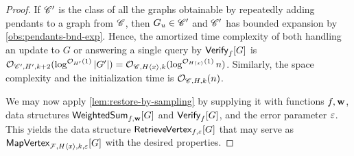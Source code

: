 \begin{proof}
	If $\mathscr C'$ is the class of all the graphs obtainable by repeatedly adding pendants to a graph from $\mathscr C$, then $G_u \in \mathscr C'$ and $\mathscr C'$ has bounded expansion by \cref{obs:pendants-bnd-exp}. Hence, the amortized time complexity of both handling an update to $G$ or answering a single query by $\mathsf{Verify}_f[G]$ is $\mathcal{O}_{\mathscr C', H', k+2}(\log^{\mathcal{O}_{H'}(1)} |G'|) = \mathcal{O}_{\mathscr C, H\langle x\rangle, k}(\log^{\mathcal{O}_{H\langle x\rangle}(1)} n)$. Similarly, the space complexity and the initialization time is $\mathcal{O}_{\mathscr C, H, k}(n)$. 
	
	We may now
	apply \cref{lem:restore-by-sampling} by supplying it with functions $f, \mathbf{w}$, data structures $\mathsf{WeightedSum}_{f, \mathbf{w}}[G]$ and $\mathsf{Verify}_f[G]$, and the error parameter $\varepsilon$. This yields the data structure $\mathsf{RetrieveVertex}_{f,\varepsilon}[G]$ that may serve as $\mathsf{MapVertex}_{\mathcal{F}, H\langle x\rangle, k,\varepsilon}[G]$ with the desired properties.
\end{proof}

%	

